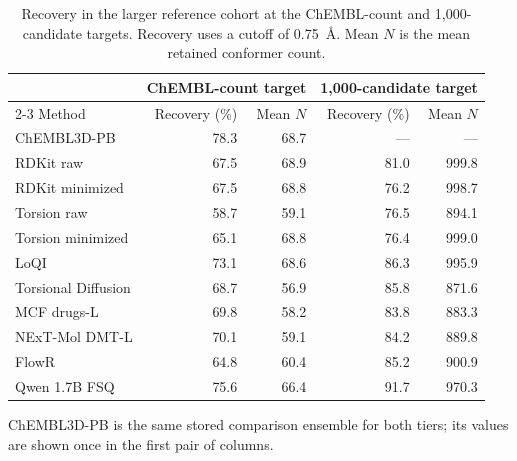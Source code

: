 \begin{table}[htbp]
\centering
\small
\setlength{\tabcolsep}{5pt}
\caption{Recovery in the larger reference cohort at the ChEMBL-count and 1,000-candidate targets. Recovery uses a cutoff of 0.75~\AA{}. Mean $N$ is the mean retained conformer count.}
\label{tab:supporting-recovery}
\begin{tabular}{lrrrr}
\hline
& \multicolumn{2}{c}{ChEMBL-count target} & \multicolumn{2}{c}{1,000-candidate target} \\
\cline{2-3}\cline{4-5}
Method & Recovery (\%) & Mean $N$ & Recovery (\%) & Mean $N$ \\
\hline
ChEMBL3D-PB & 78.3 & 68.7 & --- & --- \\
RDKit raw & 67.5 & 68.9 & 81.0 & 999.8 \\
RDKit minimized & 67.5 & 68.8 & 76.2 & 998.7 \\
Torsion raw & 58.7 & 59.1 & 76.5 & 894.1 \\
Torsion minimized & 65.1 & 68.8 & 76.4 & 999.0 \\
LoQI & 73.1 & 68.6 & 86.3 & 995.9 \\
Torsional Diffusion & 68.7 & 56.9 & 85.8 & 871.6 \\
MCF drugs-L & 69.8 & 58.2 & 83.8 & 883.3 \\
NExT-Mol DMT-L & 70.1 & 59.1 & 84.2 & 889.8 \\
FlowR & 64.8 & 60.4 & 85.2 & 900.9 \\
Qwen 1.7B FSQ & 75.6 & 66.4 & 91.7 & 970.3 \\
\hline
\end{tabular}
\par\smallskip
\begin{minipage}{\linewidth}
\footnotesize ChEMBL3D-PB is the same stored comparison ensemble for both tiers;
its values are shown once in the first pair of columns.
\end{minipage}
\end{table}
